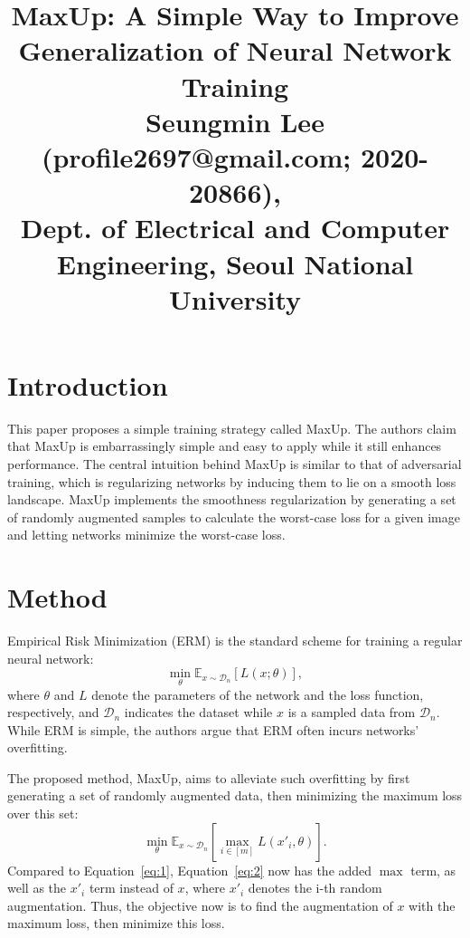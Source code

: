 \documentclass[10pt,twocolumn,letterpaper]{article}
\begin{document}
\title{MaxUp: A Simple Way to Improve Generalization of Neural Network Training\\ {\rm {\normalsize Seungmin Lee (profile2697@gmail.com; 2020-20866), \\Dept. of Electrical and Computer Engineering, Seoul National University}}}   %

\maketitle
\thispagestyle{empty}

\section{Introduction}\label{sec:introduction}
This paper proposes a simple training strategy called MaxUp. The authors claim that MaxUp is embarrassingly simple and easy to apply while it still enhances performance. The central intuition behind MaxUp is similar to that of adversarial training, which is regularizing networks by inducing them to lie on a smooth loss landscape. MaxUp implements the smoothness regularization by generating a set of randomly augmented samples to calculate the worst-case loss for a given image and letting networks minimize the worst-case loss.

\section{Method}
Empirical Risk Minimization (ERM) is the standard scheme for training a regular neural network:
\begin{equation}
	\label{eq:1}
	\min_{\theta} \mathbb{E}_{x \sim \mathcal{D}_n} \left[ L (x; \theta)\right],
\end{equation}
where $\theta$ and $L$ denote the parameters of the network and the loss function, respectively, and $\mathcal{D}_n$ indicates the dataset while $x$ is a sampled data from $\mathcal{D}_n$. While ERM is simple, the authors argue that ERM often incurs networks' overfitting.

The proposed method, MaxUp, aims to alleviate such overfitting by first generating a set of randomly augmented data, then minimizing the maximum loss over this set:
\begin{equation}
	\label{eq:2}
	\min_{\theta} \mathbb{E}_{x \sim \mathcal{D}_n} \left[ \max_{i \in [m]}L (x'_i, \theta)\right].
\end{equation}
Compared to Equation~\eqref{eq:1}, Equation~\eqref{eq:2} now has the added $\max$ term, as well as the $x'_i$ term instead of $x$, where $x'_i$ denotes the i-th random augmentation.
Thus, the objective now is to find the augmentation of $x$ with the maximum loss, then minimize this loss.
\end{document}
